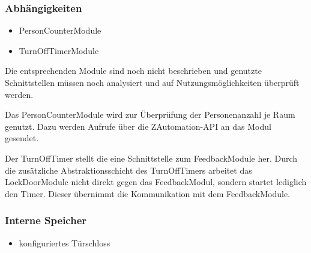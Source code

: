 
\subsubsection{Abhängigkeiten}
\begin{itemize}
	\item PersonCounterModule
	\item TurnOffTimerModule
\end{itemize}
Die entsprechenden Module sind noch nicht beschrieben und genutzte Schnittstellen müssen noch analysiert und auf Nutzungsmöglichkeiten überprüft werden.

Das PersonCounterModule wird zur Überprüfung der Personenanzahl je Raum genutzt. Dazu werden Aufrufe über die ZAutomation-API an das Modul gesendet.

Der TurnOffTimer stellt die eine Schnittstelle zum FeedbackModule her. Durch die zusätzliche Abstraktionsschicht des TurnOffTimers arbeitet das LockDoorModule nicht direkt gegen das FeedbackModul, sondern startet lediglich den Timer. Dieser übernimmt die Kommunikation mit dem FeedbackModule.


\subsubsection{Interne Speicher}
\begin{itemize}
	\item konfiguriertes Türschloss
\end{itemize}